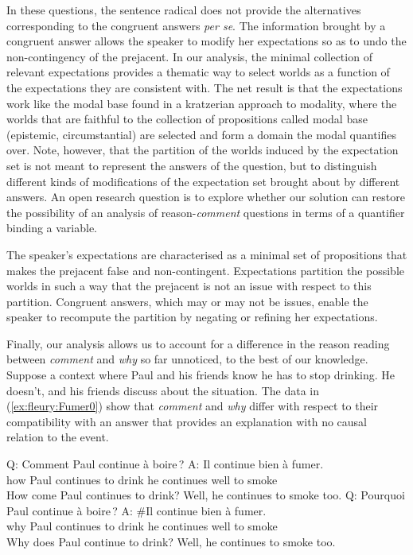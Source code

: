 \documentclass[output=paper,colorlinks,citecolor=brown,
]{langscibook}
\begin{document}
In these
questions, the sentence radical does not provide the alternatives corresponding to the congruent answers \textit{per se}. 
The information brought by a congruent answer allows the speaker to modify her expectations so as to undo the non-contingency of the prejacent. 
In our analysis, the minimal collection of relevant expectations provides a thematic way to select worlds as a function of the expectations they are consistent with. The net result is that the expectations work like the modal base found in a kratzerian approach to modality, where 
the worlds that are faithful to the collection of propositions called modal base (epistemic, circumstantial) are selected and form a domain the modal quantifies over.
Note, however, that the partition of the worlds induced by the expectation set is not meant to represent the answers of the question, but to distinguish different kinds of modifications of the expectation set brought about by different answers.
An open research question is to explore  whether our solution can restore the possibility of an analysis of reason-\textit{comment} questions in terms of a quantifier binding a variable.


The speaker's expectations are characterised as a minimal set of propositions that makes the prejacent false and non-contingent. Expectations partition the possible worlds in such a way that the prejacent is not an issue with respect to this partition. 
Congruent answers, which may or may not be issues, enable the speaker to recompute the partition by negating or refining her expectations.

Finally, our analysis allows us to account for a difference in the reason reading between \textit{comment} and \textit{why} so far unnoticed, to the best of our knowledge. Suppose a context where Paul and his friends know he has to stop drinking. He doesn't, and his friends discuss about the situation. The data in (\ref{ex:fleury:Fumer0}) show that  \textit{comment} and \textit{why} differ  with respect to their compatibility with an answer that provides an explanation with no causal relation to the event.
\begin{exe}
\ex \label{ex:fleury:Fumer0} 
\begin{xlist}
\ex \label{ex:fleury:Fumer1} \gll Q: Comment Paul continue \`a boire\,?
  A:   Il continue bien \`a fumer.\\
{} how  Paul continues to drink  {} he continues well to smoke \\
\glt How come Paul continues to drink? Well, he continues to smoke too.
\ex \label{ex:fleury:Fumer2} \gll Q: Pourquoi Paul continue \`a boire\,?
  A:   \#Il continue bien \`a fumer.\\
{} why  Paul continues to drink  {} he continues well to smoke \\
\glt Why does Paul continue to drink?  Well, he continues to smoke too.
\end{xlist}
\end{exe}
\end{document}
